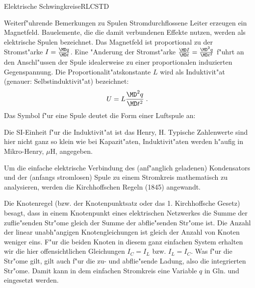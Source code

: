 \begin{MXContent}{Elektrische Schwingkreise}{RLC}{STD}
  \begin{MHint}{Weiterf"uhrende Bemerkungen zu Spulen}
  Stromdurchflossene Leiter erzeugen ein Magnetfeld. Bauelemente, die die damit verbundenen Effekte nutzen, werden als elektrische Spulen bezeichnet. Das Magnetfeld ist proportional zu der Stromst"arke $I=\frac{\MD q }{\MD t}$. Eine "Anderung der Stromst"arke $\frac{\MD I }{\MD t} = \frac{\MD^2q }{\MD t^2}$ f"uhrt an den Anschl"ussen der Spule idealerweise zu einer proportionalen induzierten Gegenspannung. Die Proportionalit"atskonstante $L$ wird als Induktivit"at (genauer: Selbstinduktivit"at) bezeichnet:
  $$
    U = L \frac{\MD^2q }{\MD t^2}\; .
  $$
  Das Symbol f"ur eine Spule deutet die Form einer Luftspule an:
  \begin{center}
    \end{center}
  Die SI-Einheit f"ur die Induktivit"at ist das Henry, H. Typische Zahlenwerte sind hier nicht ganz so klein wie bei Kapazit"aten, Induktivit"aten werden h"aufig in Mikro-Henry, $\mu$H, angegeben.

  \end{MHint}


Um die einfache elektrische Verbindung des (anf"anglich geladenen) Kondensators und der (anfangs stromlosen) Spule zu einem Stromkreis mathematisch zu analysieren, werden die Kirchhoffschen Regeln (1845) angewandt.
\begin{center}
\end{center}

Die Knotenregel (bzw. der Knotenpunktsatz oder das 1. Kirchhoffsche Gesetz) besagt, dass in einem Knotenpunkt eines elektrischen Netzwerkes die Summe der zuflie"senden Str"ome gleich der Summe der abflie"senden Str"ome ist. Die Anzahl der linear unabh"angigen Knotengleichungen ist gleich der Anzahl von Knoten weniger eins. F"ur die beiden Knoten in diesem ganz einfachen System erhalten wir die hier offensichtlichen Gleichungen $I_C=I_L$ bzw. $I_L=I_C$. Was f"ur die Str"ome gilt, gilt auch f"ur die zu- und abflie"sende Ladung, also die integrierten Str"ome. Damit kann in dem einfachen Stromkreis eine Variable $q$ in Gln.  und  eingesetzt werden. 


\end{MXContent}
